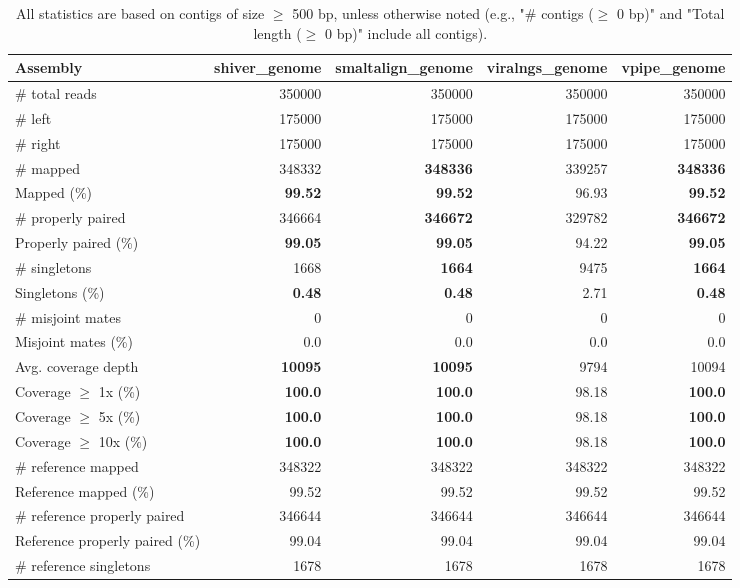 \documentclass[12pt,a4paper]{article}
\begin{document}
\begin{table}[ht]
\begin{center}
\caption{All statistics are based on contigs of size $\geq$ 500 bp, unless otherwise noted (e.g., "\# contigs ($\geq$ 0 bp)" and "Total length ($\geq$ 0 bp)" include all contigs).}
\begin{tabular}{|l*{4}{|r}|}
\hline
Assembly & shiver\_genome & smaltalign\_genome & viralngs\_genome & vpipe\_genome \\ \hline
\# total reads & 350000 & 350000 & 350000 & 350000 \\ \hline
\# left & 175000 & 175000 & 175000 & 175000 \\ \hline
\# right & 175000 & 175000 & 175000 & 175000 \\ \hline
\# mapped & 348332 & {\bf 348336} & 339257 & {\bf 348336} \\ \hline
Mapped (\%) & {\bf 99.52} & {\bf 99.52} & 96.93 & {\bf 99.52} \\ \hline
\# properly paired & 346664 & {\bf 346672} & 329782 & {\bf 346672} \\ \hline
Properly paired (\%) & {\bf 99.05} & {\bf 99.05} & 94.22 & {\bf 99.05} \\ \hline
\# singletons & 1668 & {\bf 1664} & 9475 & {\bf 1664} \\ \hline
Singletons (\%) & {\bf 0.48} & {\bf 0.48} & 2.71 & {\bf 0.48} \\ \hline
\# misjoint mates & 0 & 0 & 0 & 0 \\ \hline
Misjoint mates (\%) & 0.0 & 0.0 & 0.0 & 0.0 \\ \hline
Avg. coverage depth & {\bf 10095} & {\bf 10095} & 9794 & 10094 \\ \hline
Coverage $\geq$ 1x (\%) & {\bf 100.0} & {\bf 100.0} & 98.18 & {\bf 100.0} \\ \hline
Coverage $\geq$ 5x (\%) & {\bf 100.0} & {\bf 100.0} & 98.18 & {\bf 100.0} \\ \hline
Coverage $\geq$ 10x (\%) & {\bf 100.0} & {\bf 100.0} & 98.18 & {\bf 100.0} \\ \hline
\# reference mapped & 348322 & 348322 & 348322 & 348322 \\ \hline
Reference mapped (\%) & 99.52 & 99.52 & 99.52 & 99.52 \\ \hline
\# reference properly paired & 346644 & 346644 & 346644 & 346644 \\ \hline
Reference properly paired (\%) & 99.04 & 99.04 & 99.04 & 99.04 \\ \hline
\# reference singletons & 1678 & 1678 & 1678 & 1678 \\ \hline

\end{tabular}
\end{center}
\end{table}
\end{document}
